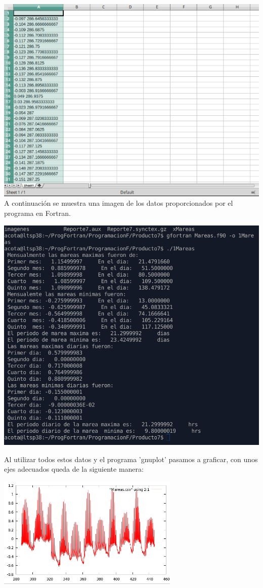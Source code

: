 \documentclass[]{article}
\begin{document}
\includegraphics[scale=0.5]{Datos}\\

A continuaci\'on se muestra una imagen de los datos proporcionados por el programa en Fortran. 

\begin{center}
\includegraphics[scale=0.5]{Mareainfo}\\

\end{center}



Al utilizar todos estos datos y el programa 'gnuplot' pasamos a graficar, con unos ejes adecuados queda de la siguiente manera:
\begin{center}
\includegraphics[scale=1]{GraficaMareas}
\end{center}
\end{document}
